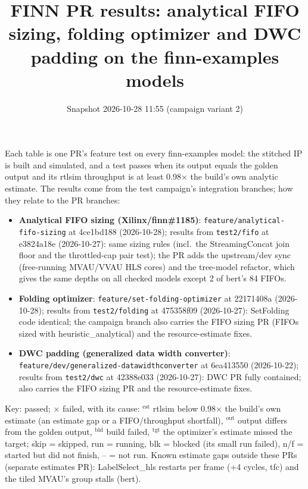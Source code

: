 \documentclass[a4paper,10pt]{article}
\title{FINN PR results: analytical FIFO sizing, folding optimizer and DWC padding on the finn-examples models}
\date{Snapshot 2026-10-28 11:55 (campaign variant 2)}
\begin{document}
\maketitle
Each table is one PR's feature test on every finn-examples model: the stitched IP is built and simulated, and a test passes when its output equals the golden output and its rtlsim throughput is at least 0.98$\times$ the build's own analytic estimate. The results come from the test campaign's integration branches; how they relate to the PR branches:
\begin{itemize}
\item \textbf{Analytical FIFO sizing (Xilinx/finn\#1185)}: \texttt{feature/analytical-fifo-sizing} at 4ce1bd188 (2026-10-28); results from \texttt{test2/fifo} at e3824a18e (2026-10-27): same sizing rules (incl.\ the StreamingConcat join floor and the throttled-cap pair test); the PR adds the upstream/dev sync (free-running MVAU/VVAU HLS cores) and the tree-model refactor, which gives the same depths on all checked models except 2 of bert's 84 FIFOs.
\item \textbf{Folding optimizer}: \texttt{feature/set-folding-optimizer} at 22171408a (2026-10-28); results from \texttt{test2/folding} at 475358f09 (2026-10-27): SetFolding code identical; the campaign branch also carries the FIFO sizing PR (FIFOs sized with heuristic\_analytical) and the resource-estimate fixes.
\item \textbf{DWC padding (generalized data width converter)}: \texttt{feature/dev/generalized-datawidthconverter} at 6ea413550 (2026-10-22); results from \texttt{test2/dwc} at 42388e033 (2026-10-27): DWC PR fully contained; also carries the FIFO sizing PR and the resource-estimate fixes.
\end{itemize}
Key: \checkmark{} passed; $\times$ failed, with its cause: $^{\mathrm{est}}$ rtlsim below 0.98$\times$ the build's own estimate (an estimate gap or a FIFO/throughput shortfall), $^{\mathrm{out}}$ output differs from the golden output, $^{\mathrm{bld}}$ build failed, $^{\mathrm{tgt}}$ the optimizer's estimate missed the target; skip = skipped, run = running, blk = blocked (its small run failed), n/f = started but did not finish, -- = not run. Known estimate gaps outside these PRs (separate estimates PR): LabelSelect\_hls restarts per frame (+4 cycles, tfc) and the tiled MVAU's group stalls (bert).
\end{document}
